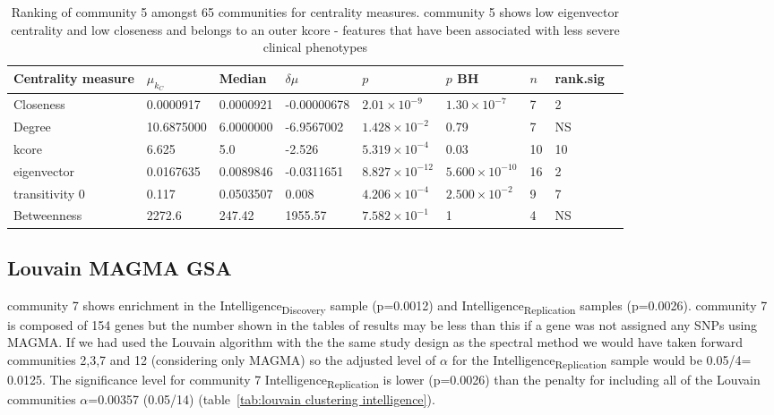 \begin{table}[]
    \centering
    \setlength{\extrarowheight}{2pt}
    \begin{adjustbox}{width=\textwidth}
   
    \begin{tabular}{lllllllll}
    \toprule
    Centrality measure & $\mu_{k_C}$ & Median & $\delta \mu$     &$p$ & $p$ BH & $n$ & rank.sig  \\
    \midrule
    Closeness     &  0.0000917  & 0.0000921 &  -0.00000678 & $2.01\times10^{-9}$ &  $1.30\times 10^{-7}$    & 7 & 2 \\
    Degree   & 10.6875000 & 6.0000000 & -6.9567002 & $1.428 \times 10^{-2}$ & 0.79 & 7 & NS\\
    kcore &6.625 & 5.0 & -2.526 & $5.319 \times 10^{-4}$ & 0.03 & 10 & 10 \\  
    eigenvector & 0.0167635 & 0.0089846 & -0.0311651 & $8.827 \times 10^{-12}$ & $5.600 \times 10^{-10}$ & 16 & 2\\ 
    transitivity 0 & 0.117 & 0.0503507 & 0.008 & $4.206 \times 10^{-4}$ & $2.500 \times 10^{-2}$ & 9 & 7\\
    Betweenness&2272.6 & 247.42 & 1955.57 & $7.582 \times 10^{-1}$ & 1 & 4 & NS \\ 
    \bottomrule
   \end{tabular}
    \end{adjustbox}
    \caption{Ranking of community 5 amongst 65 communities for centrality measures. community 5 shows low eigenvector centrality and low closeness and belongs to an outer kcore - features that have been associated with less severe clinical phenotypes}
    \label{tab:centrality_measures_for_group5}
\end{table}





\subsection{Louvain MAGMA GSA}
\label{sec: Louvain GSA}
community 7 shows enrichment in the Intelligence\textsubscript{Discovery} sample (p=0.0012) and Intelligence\textsubscript{Replication} samples (p=0.0026). community 7 is composed of 154 genes but the number shown in the tables of results may be less than this if a gene was not assigned any SNPs using MAGMA. If we had used the Louvain algorithm with the the same study design as the spectral method we would have taken forward communities 2,3,7 and 12 (considering only MAGMA) so the adjusted level of $\alpha$ for the Intelligence\textsubscript{Replication} sample would be 0.05/4= 0.0125. The significance level for community 7 Intelligence\textsubscript{Replication} is lower (p=0.0026) than the penalty for including all of the Louvain communities $\alpha$=0.00357 (0.05/14) (table~\ref{tab:louvain clustering intelligence}).

